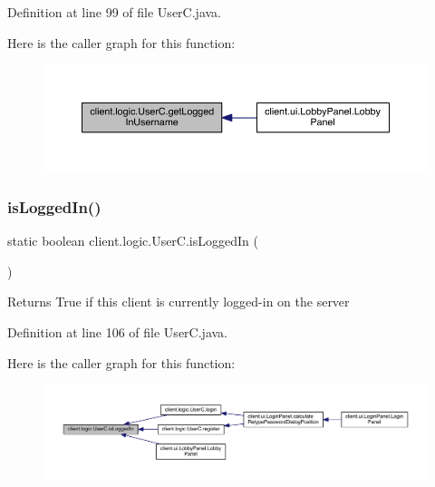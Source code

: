Definition at line 99 of file User\+C.\+java.

Here is the caller graph for this function\+:
\nopagebreak
\begin{figure}[H]
\begin{center}
\leavevmode
\includegraphics[width=350pt]{classclient_1_1logic_1_1_user_c_a93ff0dc94af63f55144147389b0b2bdf_icgraph}
\end{center}
\end{figure}
\hypertarget{classclient_1_1logic_1_1_user_c_ad4fb84e487e917c202a4e1bcdea62dd5}{}\label{classclient_1_1logic_1_1_user_c_ad4fb84e487e917c202a4e1bcdea62dd5} 
\subsubsection{\texorpdfstring{is\+Logged\+In()}{isLoggedIn()}}
{\footnotesize\ttfamily static boolean client.\+logic.\+User\+C.\+is\+Logged\+In (\begin{DoxyParamCaption}{ }\end{DoxyParamCaption})\hspace{0.3cm}{\ttfamily [static]}}

\begin{DoxyReturn}{Returns}
True if this client is currently logged-\/in on the server 
\end{DoxyReturn}


Definition at line 106 of file User\+C.\+java.

Here is the caller graph for this function\+:
\nopagebreak
\begin{figure}[H]
\begin{center}
\leavevmode
\includegraphics[width=350pt]{classclient_1_1logic_1_1_user_c_ad4fb84e487e917c202a4e1bcdea62dd5_icgraph}
\end{center}
\end{figure}
\hypertarget{classclient_1_1logic_1_1_user_c_a724d1799c3963f516238cdf0d85ccf52}{}\label{classclient_1_1logic_1_1_user_c_a724d1799c3963f516238cdf0d85ccf52} 
